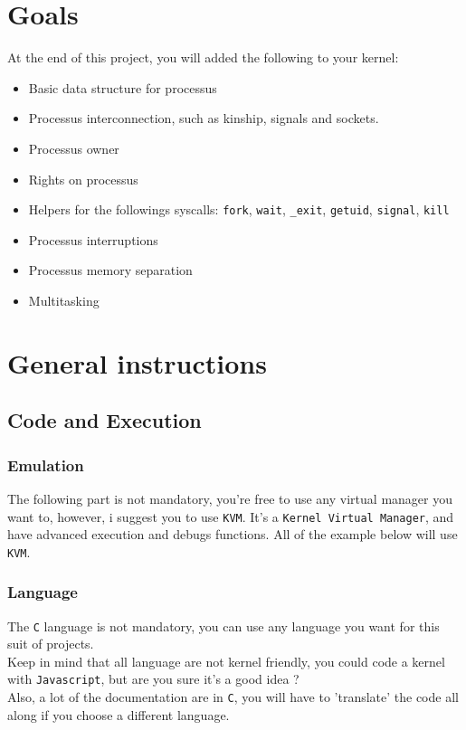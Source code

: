 \documentclass{42-en}
\begin{document}
\chapter{Goals}

At the end of this project, you will added the following to your kernel:
\begin{itemize}\itemsep1pt
	\item Basic data structure for processus
	\item Processus interconnection, such as kinship, signals and sockets.
	\item Processus owner
	\item Rights on processus
	\item Helpers for the followings syscalls: \texttt{fork}, \texttt{wait}, 
	\texttt{\_exit}, \texttt{getuid}, \texttt{signal}, \texttt{kill}
	\item Processus interruptions
	\item Processus memory separation
	\item Multitasking
\end{itemize}


\newpage
\chapter{General instructions}
	\section{Code and Execution}
		\subsection{Emulation}
		The following part is not mandatory, you're free to use any virtual
		manager you want to, however, i suggest you to use \texttt{KVM}.
		It's a \texttt{Kernel Virtual Manager}, and have advanced execution
		and debugs functions.
		All of the example below will use \texttt{KVM}.
		\subsection{Language}
			The \texttt{C} language is not mandatory, you can use any language
			you want for this suit of projects.\\
			Keep in mind that all language are not kernel friendly, you could
			code a kernel with \texttt{Javascript}, but are you sure
			it's a good idea ?\\ Also, a lot of the documentation are
			in \texttt{C}, you will have to 'translate' the code all along
			if you choose a different language.\\
\end{document}
